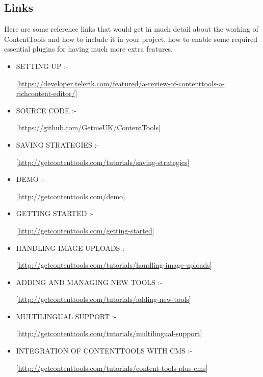 \subsection{Links}
Here are some reference links that would get in much detail about the working of
ContentTools and how to include it in your project, how to enable some required essential
plugins for having much more extra features.  \newline
\begin{itemize}
\item SETTING UP :- 
\begin{center}
[\url{https://developer.telerik.com/featured/a-review-of-contenttools-a-richcontent-editor/}]
\end{center}
\item SOURCE CODE :- 
\begin{center}
[\url{https://github.com/GetmeUK/ContentTools}]
\end{center} 
\item SAVING STRATEGIES :- 
\begin{center}
[\url{http://getcontenttools.com/tutorials/saving-strategies}]
\end{center}
\item DEMO :- 
\begin{center}
[\url{http://getcontenttools.com/demo}]
\end{center}
\item GETTING STARTED :- 
\begin{center}
[\url{http://getcontenttools.com/getting-started}]
\end{center}
\item HANDLING IMAGE UPLOADS :- 
\begin{center}
[\url{http://getcontenttools.com/tutorials/handling-image-uploads}]
\end{center}
\item ADDING AND MANAGING NEW TOOLS :-  
\begin{center}
[\url{http://getcontenttools.com/tutorials/adding-new-tools}]
\end{center}
\item MULTILINGUAL SUPPORT :- 
\begin{center}
[\url{http://getcontenttools.com/tutorials/multilingual-support}]
\end{center}
\item INTEGRATION OF CONTENTTOOLS WITH CMS :- 
\begin{center}
[\url{http://getcontenttools.com/tutorials/content-tools-plus-cms}]

\end{center}
\end{itemize}
